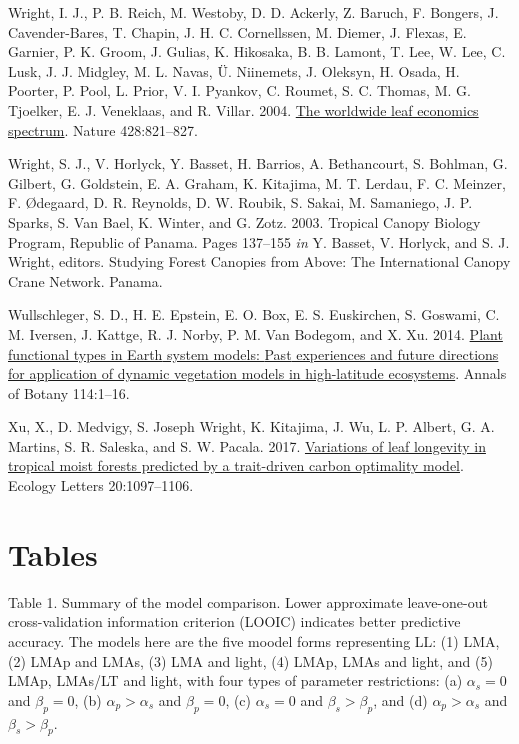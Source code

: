 \documentclass[
  12pt,
  a4paper,
,tablecaptionabove
]{scrartcl}
\newlength{\cslhangindent}
\newenvironment{CSLReferences}[2] %
 {%
  \setlength{\parindent}{0pt}
  \ifodd #1 \everypar{\setlength{\hangindent}{\cslhangindent}}\ignorespaces\fi
  \ifnum #2 > 0
  \setlength{\parskip}{#2\baselineskip}
  \fi
 }%
 {}
\begin{document}
\begin{CSLReferences}{1}{0}
\leavevmode{}%
Wright, I. J., P. B. Reich, M. Westoby, D. D. Ackerly, Z. Baruch, F.
Bongers, J. Cavender-Bares, T. Chapin, J. H. C. Cornellssen, M. Diemer,
J. Flexas, E. Garnier, P. K. Groom, J. Gulias, K. Hikosaka, B. B.
Lamont, T. Lee, W. Lee, C. Lusk, J. J. Midgley, M. L. Navas, Ü.
Niinemets, J. Oleksyn, H. Osada, H. Poorter, P. Pool, L. Prior, V. I.
Pyankov, C. Roumet, S. C. Thomas, M. G. Tjoelker, E. J. Veneklaas, and
R. Villar. 2004. \href{https://doi.org/10.1038/nature02403}{The
worldwide leaf economics spectrum}. Nature 428:821--827.

\leavevmode{}%
Wright, S. J., V. Horlyck, Y. Basset, H. Barrios, A. Bethancourt, S.
Bohlman, G. Gilbert, G. Goldstein, E. A. Graham, K. Kitajima, M. T.
Lerdau, F. C. Meinzer, F. Ødegaard, D. R. Reynolds, D. W. Roubik, S.
Sakai, M. Samaniego, J. P. Sparks, S. Van Bael, K. Winter, and G. Zotz.
2003. Tropical {Canopy Biology Program}, {Republic} of {Panama}. Pages
137--155 \emph{in} Y. Basset, V. Horlyck, and S. J. Wright, editors.
Studying {Forest Canopies} from {Above}: {The International Canopy Crane
Network}. {Panama}.

\leavevmode{}%
Wullschleger, S. D., H. E. Epstein, E. O. Box, E. S. Euskirchen, S.
Goswami, C. M. Iversen, J. Kattge, R. J. Norby, P. M. Van Bodegom, and
X. Xu. 2014. \href{https://doi.org/10.1093/aob/mcu077}{Plant functional
types in {Earth} system models: {Past} experiences and future directions
for application of dynamic vegetation models in high-latitude
ecosystems}. Annals of Botany 114:1--16.

\leavevmode{}%
Xu, X., D. Medvigy, S. Joseph Wright, K. Kitajima, J. Wu, L. P. Albert,
G. A. Martins, S. R. Saleska, and S. W. Pacala. 2017.
\href{https://doi.org/10.1111/ele.12804}{Variations of leaf longevity in
tropical moist forests predicted by a trait-driven carbon optimality
model}. Ecology Letters 20:1097--1106.

\end{CSLReferences}

\newpage

\hypertarget{tables}{%
\section{Tables}\label{tables}}

Table 1. Summary of the model comparison. Lower approximate
leave-one-out cross-validation information criterion (LOOIC) indicates
better predictive accuracy. The models here are the five moodel forms
representing LL: (1) LMA, (2) LMAp and LMAs, (3) LMA and light, (4)
LMAp, LMAs and light, and (5) LMAp, LMAs/LT and light, with four types
of parameter restrictions: (a) \(\alpha_s = 0\) and \(\beta_p = 0\), (b)
\(\alpha_p > \alpha_s\) and \(\beta_p = 0\), (c) \(\alpha_s = 0\) and
\(\beta_s > \beta_p\), and (d) \(\alpha_p > \alpha_s\) and
\(\beta_s > \beta_p\).
\end{document}
